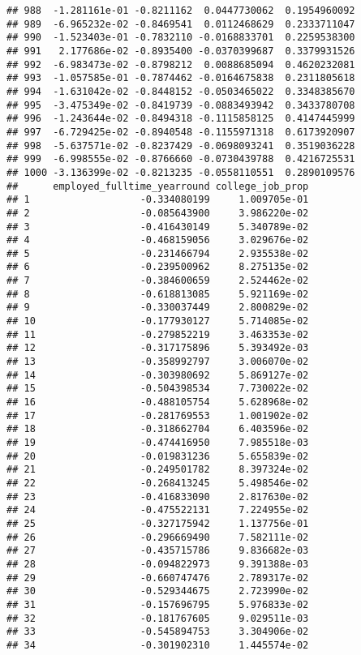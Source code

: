 \documentclass[
]{article}
\begin{document}
\begin{verbatim}
## 988  -1.281161e-01 -0.8211162  0.0447730062  0.1954960092
## 989  -6.965232e-02 -0.8469541  0.0112468629  0.2333711047
## 990  -1.523403e-01 -0.7832110 -0.0168833701  0.2259538300
## 991   2.177686e-02 -0.8935400 -0.0370399687  0.3379931526
## 992  -6.983473e-02 -0.8798212  0.0088685094  0.4620232081
## 993  -1.057585e-01 -0.7874462 -0.0164675838  0.2311805618
## 994  -1.631042e-02 -0.8448152 -0.0503465022  0.3348385670
## 995  -3.475349e-02 -0.8419739 -0.0883493942  0.3433780708
## 996  -1.243644e-02 -0.8494318 -0.1115858125  0.4147445999
## 997  -6.729425e-02 -0.8940548 -0.1155971318  0.6173920907
## 998  -5.637571e-02 -0.8237429 -0.0698093241  0.3519036228
## 999  -6.998555e-02 -0.8766660 -0.0730439788  0.4216725531
## 1000 -3.136399e-02 -0.8213235 -0.0558110551  0.2890109576
##      employed_fulltime_yearround college_job_prop
## 1                   -0.334080199     1.009705e-01
## 2                   -0.085643900     3.986220e-02
## 3                   -0.416430149     5.340789e-02
## 4                   -0.468159056     3.029676e-02
## 5                   -0.231466794     2.935538e-02
## 6                   -0.239500962     8.275135e-02
## 7                   -0.384600659     2.524462e-02
## 8                   -0.618813085     5.921169e-02
## 9                   -0.330037449     2.800829e-02
## 10                  -0.177930127     5.714085e-02
## 11                  -0.279852219     3.463353e-02
## 12                  -0.317175896     5.393492e-03
## 13                  -0.358992797     3.006070e-02
## 14                  -0.303980692     5.869127e-02
## 15                  -0.504398534     7.730022e-02
## 16                  -0.488105754     5.628968e-02
## 17                  -0.281769553     1.001902e-02
## 18                  -0.318662704     6.403596e-02
## 19                  -0.474416950     7.985518e-03
## 20                  -0.019831236     5.655839e-02
## 21                  -0.249501782     8.397324e-02
## 22                  -0.268413245     5.498546e-02
## 23                  -0.416833090     2.817630e-02
## 24                  -0.475522131     7.224955e-02
## 25                  -0.327175942     1.137756e-01
## 26                  -0.296669490     7.582111e-02
## 27                  -0.435715786     9.836682e-03
## 28                  -0.094822973     9.391388e-03
## 29                  -0.660747476     2.789317e-02
## 30                  -0.529344675     2.723990e-02
## 31                  -0.157696795     5.976833e-02
## 32                  -0.181767605     9.029511e-03
## 33                  -0.545894753     3.304906e-02
## 34                  -0.301902310     1.445574e-02

\end{verbatim}
\end{document}
